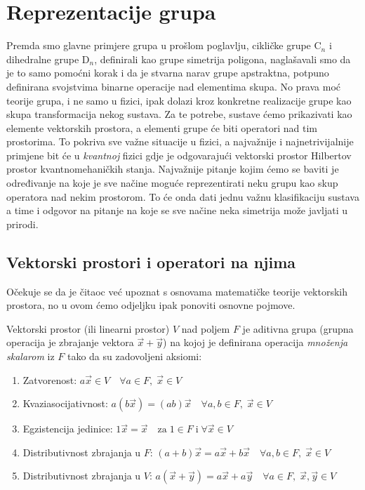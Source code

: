 
\chapter{Reprezentacije grupa}

Premda smo glavne primjere grupa u prošlom poglavlju,
cikličke grupe $\mathrm{C}_n$ i dihedralne grupe $\mathrm{D}_n$,
definirali kao grupe simetrija poligona,
naglašavali smo da je to samo pomoćni korak i da je stvarna
narav grupe apstraktna, potpuno definirana svojstvima binarne
operacije nad elementima skupa.
No prava moć teorije grupa, i ne samo u fizici, ipak dolazi kroz
konkretne realizacije grupe kao skupa transformacija
nekog sustava. Za te potrebe, sustave ćemo
prikazivati kao elemente vektorskih prostora, a elementi
grupe će biti operatori nad tim prostorima.
To pokriva sve važne situacije u fizici, a najvažnije
i najnetrivijalnije primjene bit će u \emph{kvantnoj} fizici gdje
je odgovarajući vektorski prostor Hilbertov prostor kvantnomehaničkih
stanja. Najvažnije pitanje kojim ćemo se baviti je određivanje na koje je
sve načine moguće reprezentirati neku grupu kao skup operatora nad
nekim prostorom.
To će onda dati jednu važnu klasifikaciju sustava a time i odgovor na pitanje
na koje se sve načine neka simetrija može javljati u prirodi.



\section{Vektorski prostori i operatori na njima}

Očekuje se da je čitaoc već upoznat s osnovama matematičke
teorije vektorskih prostora, no u ovom ćemo odjeljku ipak ponoviti
osnovne pojmove.

\begin{definicija}
Vektorski prostor (ili linearni prostor) $V$ nad poljem $F$ je aditivna grupa
(grupna operacija je zbrajanje vektora $\vec{x}+\vec{y}$) na
kojoj je definirana operacija \emph{množenja skalarom} iz $F$ tako
da su zadovoljeni aksiomi:
\begin{enumerate}
\item Zatvorenost: $a\vec{x}\in V \quad \forall a\in F,\; \vec{x}\in V$
\item Kvaziasocijativnost: $a(b\vec{x})=(ab)\vec{x} \quad
 \forall a,b \in F,\; \vec{x}\in V$
\item Egzistencija jedinice: $ 1\vec{x}=\vec{x} \quad \text{za}\; 1\in F
 \;\text{i}\; \forall \vec{x} \in V $
\item Distributivnost zbrajanja u $F$:
 $(a+b)\vec{x} = a \vec{x} + b \vec{x} \quad \forall a,b \in F,\;\vec{x} \in V$
\item Distributivnost zbrajanja u $V$:
 $a(\vec{x} + \vec{y}) = a \vec{x} + a \vec{y} \quad \forall a \in F,\; 
 \vec{x}, \vec{y} \in V$
\end{enumerate}
\end{definicija}


